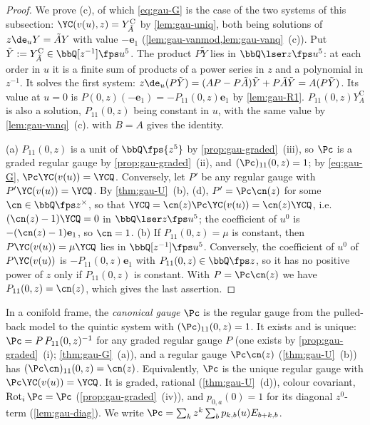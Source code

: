 \begin{proof}
We prove (c), of which \eqref{eq:gau-G} is the case of the two systems of this subsection: $\YC(v(u),z)=Y^{\mathrm C}_{\tilde A}$ by \cref{lem:gau-uniq}, both being solutions of $z\de_uY=\tilde AY$ with value $-\mathbf e_1$ (\cref{lem:gau-vanmod,lem:gau-vanq}~(c)). Put $\tilde Y:=Y^{\mathrm C}_{\tilde A}\in\bbQ[z^{-1}]\fps u^5$. The product $P\tilde Y$ lies in $\bbQ\lser z\fps u^5$: at each order in $u$ it is a finite sum of products of a power series in $z$ and a polynomial in $z^{-1}$. It solves the first system: $z\de_u(P\tilde Y)=(AP-P\tilde A)\tilde Y+P\tilde A\tilde Y=A(P\tilde Y)$. Its value at $u=0$ is $P(0,z)(-\mathbf e_1)=-P_{11}(0,z)\mathbf e_1$ by \cref{lem:gau-R1}. $P_{11}(0,z)Y^{\mathrm C}_A$ is also a solution, $P_{11}(0,z)$ being constant in $u$, with the same value by \cref{lem:gau-vanq}~(c).  with $B=A$ gives the identity.

(a) $P_{11}(0,z)$ is a unit of $\bbQ\fps{z^5}$ by \cref{prop:gau-graded}~(iii), so $\Pc$ is a graded regular gauge by \cref{prop:gau-graded}~(ii), and $(\Pc)_{11}(0,z)=1$; by \eqref{eq:gau-G}, $\Pc\YC(v(u))=\YCQ$. Conversely, let $P'$ be any regular gauge with $P'\YC(v(u))=\YCQ$. By \cref{thm:gau-U}~(b), (d), $P'=\Pc\cn(z)$ for some $\cn\in\bbQ\fps z^\times$, so that $\YCQ=\cn(z)\Pc\YC(v(u))=\cn(z)\YCQ$, i.e.\ $(\cn(z)-1)\YCQ=0$ in $\bbQ\lser z\fps u^5$; the coefficient of $u^0$ is $-(\cn(z)-1)\mathbf e_1$, so $\cn=1$. (b) If $P_{11}(0,z)=\mu$ is constant, then $P\YC(v(u))=\mu\YCQ$ lies in $\bbQ[z^{-1}]\fps u^5$. Conversely, the coefficient of $u^0$ of $P\YC(v(u))$ is $-P_{11}(0,z)\mathbf e_1$ with $P_{11}(0,z)\in\bbQ\fps z$, so it has no positive power of $z$ only if $P_{11}(0,z)$ is constant. With $P=\Pc\cn(z)$ we have $P_{11}(0,z)=\cn(z)$, which gives the last assertion.
\end{proof}

\begin{defn}
\label{def:gau-can}
In a conifold frame, the \emph{canonical gauge} $\Pc$ is the regular gauge from the pulled-back model to the quintic system with $(\Pc)_{11}(0,z)=1$. It exists and is unique: $\Pc=P\,P_{11}(0,z)^{-1}$ for any graded regular gauge $P$ (one exists by \cref{prop:gau-graded}~(i); \cref{thm:gau-G}~(a)), and a regular gauge $\Pc\cn(z)$ (\cref{thm:gau-U}~(b)) has $(\Pc\cn)_{11}(0,z)=\cn(z)$. Equivalently, $\Pc$ is the unique regular gauge with $\Pc\YC(v(u))=\YCQ$. It is graded, rational (\cref{thm:gau-U}~(d)), colour covariant, $\operatorname{Rot}_i\Pc=\Pc$ (\cref{prop:gau-graded}~(iv)), and $p_{0,a}(0)=1$ for its diagonal $z^0$-term (\cref{lem:gau-diag}). We write $\Pc=\sum_kz^k\sum_bp_{k,b}(u)E_{b+k,b}$.
\end{defn}

